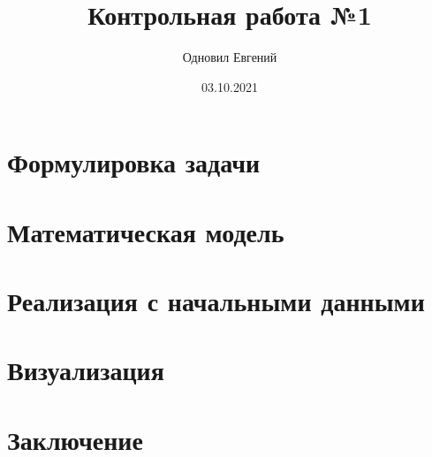 \documentclass[14pt]{extarticle}
\author{Одновил Евгений}
\title{Контрольная работа №1}
\date{03.10.2021}
\newcommand{\nonumtoc}{\setcounter{secnumdepth}{0}}
\begin{document}
	\nonumtoc
	\maketitle
	\thispagestyle{empty}
	\pagebreak
	\tableofcontents
	\pagebreak
	
	\section{Формулировка задачи}
	\section{Математическая модель}
	\section{Реализация с начальными данными}
	\section{Визуализация}
	\section{Заключение}
\end{document}
